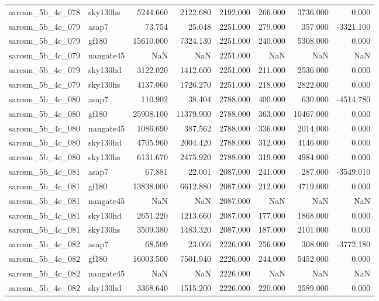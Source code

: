 \begin{tabular}{llrrrrrr}
sarcsm\_5b\_4c\_078 & sky130hs & 5244.660 & 2122.680 & 2192.000 & 266.000 & 3736.000 & 0.000 \\
sarcsm\_5b\_4c\_079 & asap7 & 73.754 & 25.048 & 2251.000 & 279.000 & 357.000 & -3321.100 \\
sarcsm\_5b\_4c\_079 & gf180 & 15610.000 & 7324.130 & 2251.000 & 240.000 & 5308.000 & 0.000 \\
sarcsm\_5b\_4c\_079 & nangate45 & NaN & NaN & 2251.000 & NaN & NaN & NaN \\
sarcsm\_5b\_4c\_079 & sky130hd & 3122.020 & 1412.600 & 2251.000 & 211.000 & 2536.000 & 0.000 \\
sarcsm\_5b\_4c\_079 & sky130hs & 4137.060 & 1726.270 & 2251.000 & 218.000 & 2822.000 & 0.000 \\
sarcsm\_5b\_4c\_080 & asap7 & 110.902 & 38.404 & 2788.000 & 400.000 & 630.000 & -4514.780 \\
sarcsm\_5b\_4c\_080 & gf180 & 25908.100 & 11379.900 & 2788.000 & 363.000 & 10467.000 & 0.000 \\
sarcsm\_5b\_4c\_080 & nangate45 & 1086.690 & 387.562 & 2788.000 & 336.000 & 2014.000 & 0.000 \\
sarcsm\_5b\_4c\_080 & sky130hd & 4705.960 & 2004.420 & 2788.000 & 312.000 & 4146.000 & 0.000 \\
sarcsm\_5b\_4c\_080 & sky130hs & 6131.670 & 2475.920 & 2788.000 & 319.000 & 4984.000 & 0.000 \\
sarcsm\_5b\_4c\_081 & asap7 & 67.881 & 22.001 & 2087.000 & 241.000 & 287.000 & -3549.010 \\
sarcsm\_5b\_4c\_081 & gf180 & 13838.000 & 6612.880 & 2087.000 & 212.000 & 4719.000 & 0.000 \\
sarcsm\_5b\_4c\_081 & nangate45 & NaN & NaN & 2087.000 & NaN & NaN & NaN \\
sarcsm\_5b\_4c\_081 & sky130hd & 2651.220 & 1213.660 & 2087.000 & 177.000 & 1868.000 & 0.000 \\
sarcsm\_5b\_4c\_081 & sky130hs & 3509.380 & 1483.320 & 2087.000 & 187.000 & 2101.000 & 0.000 \\
sarcsm\_5b\_4c\_082 & asap7 & 68.509 & 23.066 & 2226.000 & 256.000 & 308.000 & -3772.180 \\
sarcsm\_5b\_4c\_082 & gf180 & 16003.500 & 7501.940 & 2226.000 & 244.000 & 5452.000 & 0.000 \\
sarcsm\_5b\_4c\_082 & nangate45 & NaN & NaN & 2226.000 & NaN & NaN & NaN \\
sarcsm\_5b\_4c\_082 & sky130hd & 3368.640 & 1515.200 & 2226.000 & 220.000 & 2589.000 & 0.000 \\

\end{tabular}
